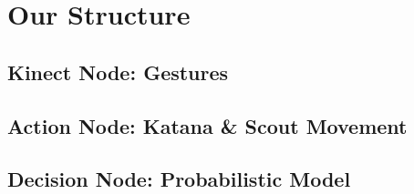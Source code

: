 \section{Our Structure}

\subsection{Kinect Node: Gestures}

\subsection{Action Node: Katana \& Scout Movement}

\subsection{Decision Node: Probabilistic Model}
